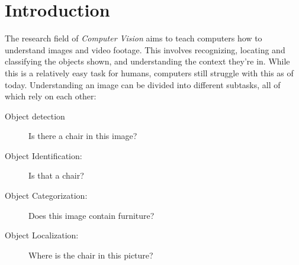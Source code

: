 \documentclass[twoside,a4paper]{article}
\title{\papertitle}
\affiliation{
\paperauthorA}
{\href{http://www.haw-hamburg.de/ti-i}{Hamburg University of Applied Sciences,
    Dept. Computer Science,} \\ Berliner Tor 7\\ 20099 Hamburg, Germany\\
{\ttfamily \href{mailto:lotte.steenbrink@haw-hamburg.de}{lotte.steenbrink@haw-hamburg.de}}
}
\newif\ifpdf
\begin{document}
\ifpdf %
  \DeclareGraphicsExtensions{.png,.jpg,.pdf}
\else  %
\fi

\maketitle

\begin{abstract}
Recognizing an categorizing objects in an image is one of the problems which are harder to solve for computers than for humans. However, image recognition is imperative to make human-computer interaction more natural and improve the way information contained in images is stored and handled. In recent years, the field has seen a lot of progress. This paper aims to provide an overview over the challenges faced by image recognition software, and available solutions as well as their limitations.
\end{abstract}


\section{Introduction}
\label{sec:intro}



The research field of \emph{Computer Vision} aims to teach computers how to understand images and video footage. This involves recognizing, locating and classifying the objects shown, and understanding the context they're in.
While this is a relatively easy task for humans, computers still struggle with this as of today. Understanding an image can be divided into different subtasks, all of which rely on each other:
\begin{description}
\item[Object detection] Is there a chair in this image?
\item[Object Identification:] Is that a chair?
\item[Object Categorization:] Does this image contain furniture?
\item[Object Localization:] Where is the chair in this picture?
\end{description}
\end{document}
